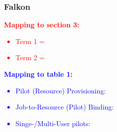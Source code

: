 \documentclass{sig-alternate}
\begin{document}
%
%
%
%
%
%
%
%
%


\subsubsection{Falkon}

\textcolor{red}
{
\textbf{Mapping to section 3:}
\begin{itemize}
\item Term 1 =
\item Term 2 =
\end{itemize}
}

\textcolor{blue}
{
\textbf{Mapping to table 1:}
\begin{itemize}
\item Pilot (Resource) Provisioning:
\item Job-to-Resource (Pilot) Binding:
\item Singe-/Multi-User pilots:
\end{itemize}
}

\end{document}
